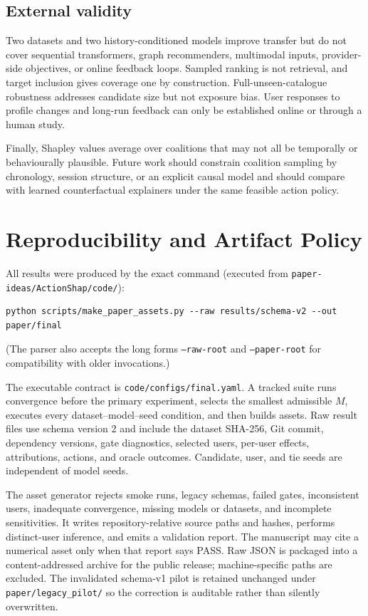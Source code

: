\documentclass[pdflatex,sn-basic]{sn-jnl}
\begin{document}
\subsection{External validity}
Two datasets and two history-conditioned models improve transfer but do not cover sequential transformers, graph recommenders, multimodal inputs, provider-side objectives, or online feedback loops. Sampled ranking is not retrieval, and target inclusion gives coverage one by construction. Full-unseen-catalogue robustness addresses candidate size but not exposure bias. User responses to profile changes and long-run feedback can only be established online or through a human study.

Finally, Shapley values average over coalitions that may not all be temporally or behaviourally plausible. Future work should constrain coalition sampling by chronology, session structure, or an explicit causal model and should compare with learned counterfactual explainers under the same feasible action policy.

\section{Reproducibility and Artifact Policy}
All results were produced by the exact command (executed from \texttt{paper-ideas/ActionShap/code/}):

\begin{verbatim}
python scripts/make_paper_assets.py --raw results/schema-v2 --out paper/final
\end{verbatim}

(The parser also accepts the long forms \texttt{--raw-root} and \texttt{--paper-root} for compatibility with older invocations.)

The executable contract is \texttt{code/configs/final.yaml}. A tracked suite runs convergence before the primary experiment, selects the smallest admissible $M$, executes every dataset--model--seed condition, and then builds assets. Raw result files use schema version 2 and include the dataset SHA-256, Git commit, dependency versions, gate diagnostics, selected users, per-user effects, attributions, actions, and oracle outcomes. Candidate, user, and tie seeds are independent of model seeds.

The asset generator rejects smoke runs, legacy schemas, failed gates, inconsistent users, inadequate convergence, missing models or datasets, and incomplete sensitivities. It writes repository-relative source paths and hashes, performs distinct-user inference, and emits a validation report. The manuscript may cite a numerical asset only when that report says PASS. Raw JSON is packaged into a content-addressed archive for the public release; machine-specific paths are excluded. The invalidated schema-v1 pilot is retained unchanged under \texttt{paper/legacy\_pilot/} so the correction is auditable rather than silently overwritten.
\end{document}
